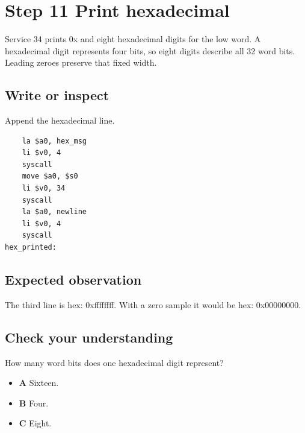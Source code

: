 \section{Step 11 Print
  hexadecimal}\label{004-bit-inspector-s11-step-11-print-hexadecimal}

Service 34 prints 0x and eight hexadecimal digits for the low word. A
hexadecimal digit represents four bits, so eight digits describe all 32
word bits. Leading zeroes preserve that fixed width.

\subsection{Write or
  inspect}\label{004-bit-inspector-s11-write-or-inspect}

Append the hexadecimal line.

\begin{verbatim}
    la $a0, hex_msg
    li $v0, 4
    syscall
    move $a0, $s0
    li $v0, 34
    syscall
    la $a0, newline
    li $v0, 4
    syscall
hex_printed:
\end{verbatim}

\subsection{Expected
  observation}\label{004-bit-inspector-s11-expected-observation}

The third line is hex: 0xffffffff. With a zero sample it would be hex:
0x00000000.

\subsection{Check your
  understanding}\label{004-bit-inspector-s11-check-your-understanding}

How many word bits does one hexadecimal digit represent?

\begin{itemize}
  \tightlist
  \item
        \textbf{A} Sixteen.
  \item
        \textbf{B} Four.
  \item
        \textbf{C} Eight.
\end{itemize}
